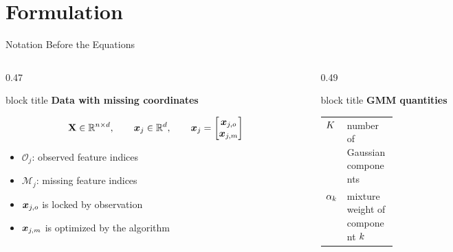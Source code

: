 \section{Formulation}

\begin{frame}[shrink=6]{Notation Before the Equations}
    \small
    \begin{columns}[T,onlytextwidth]
        \begin{column}{0.47\textwidth}
            \begin{beamercolorbox}[sep=0.75em, rounded=true, shadow=true]{block title}
                \textbf{Data with missing coordinates}
            \end{beamercolorbox}
            \vspace{0.08cm}
            \[
                \mathbf{X}\in\mathbb{R}^{n\times d},\qquad
                \bm{x}_j\in\mathbb{R}^{d},\qquad
                \bm{x}_j=
                \begin{bmatrix}
                    \bm{x}_{j,o}\\
                    \bm{x}_{j,m}
                \end{bmatrix}
            \]
            \begin{itemize}
                \item \(\mathcal{O}_j\): observed feature indices
                \item \(\mathcal{M}_j\): missing feature indices
                \item \(\bm{x}_{j,o}\) is locked by observation
                \item \(\bm{x}_{j,m}\) is optimized by the algorithm
            \end{itemize}
        \end{column}
        \begin{column}{0.49\textwidth}
            \begin{beamercolorbox}[sep=0.75em, rounded=true, shadow=true]{block title}
                \textbf{GMM quantities}
            \end{beamercolorbox}
            \vspace{0.08cm}
            \renewcommand{\arraystretch}{1.28}
            \begin{tabularx}{\linewidth}{@{}>{\raggedright\arraybackslash}p{0.26\linewidth}X@{}}
                \(K\) & number of Gaussian components \\
                \(\alpha_k\) & mixture weight of component \(k\) \\

\end{tabularx}
\end{column}
\end{columns}
\end{frame}
